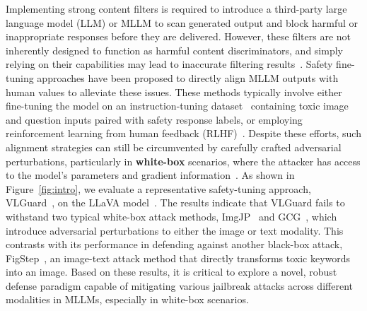 Implementing strong content filters is required to introduce a third-party large language model (LLM) or MLLM to scan generated output and block harmful or inappropriate responses before they are delivered. However, these filters are not inherently designed to function as harmful content discriminators, and simply relying on their capabilities may lead to inaccurate filtering results~\citep{cao2023defending}. 
Safety fine-tuning approaches have been proposed to directly align MLLM outputs with human values to alleviate these issues. These methods typically involve either fine-tuning the model on an instruction-tuning dataset~\citep{zong2024safety} containing toxic image and question inputs paired with safety response labels, or employing reinforcement learning from human feedback (RLHF)~\citep{chen2024dress}. Despite these efforts, such alignment strategies can still be circumvented by carefully crafted adversarial perturbations, particularly in \textbf{white-box} scenarios, where the attacker has access to the model's parameters and gradient information~\citep{zong2024safety}. As shown in Figure~\ref{fig:intro}, we evaluate a representative safety-tuning approach, VLGuard~\citep{zong2024safety}, on the LLaVA model~\citep{liu2024visual}. The results indicate that VLGuard fails to withstand two typical white-box attack methods, ImgJP~\citep{niu2024jailbreaking} and GCG~\citep{zou2023universal}, which introduce adversarial perturbations to either the image or text modality. This contrasts with its performance in defending against another black-box attack, FigStep~\citep{gong2023figstep}, an image-text attack method that directly transforms toxic keywords into an image.
Based on these results, it is critical to explore a novel, robust defense paradigm capable of mitigating various jailbreak attacks across different modalities in MLLMs, especially in white-box scenarios.






